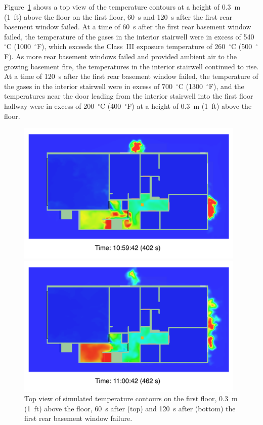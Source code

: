 \documentclass[12pt,oneside]{book}
\begin{document}
Figure~\ref{fig:smv_flow_path_top_2} shows a top view of the temperature contours at a height of 0.3~m (1~ft) above the floor on the first floor, 60~s and 120~s after the first rear basement window failed. At a time of 60~s after the first rear basement window failed, the temperature of the gases in the interior stairwell were in excess of 540~$^{\circ}$C (1000~$^{\circ}$F), which exceeds the Class~III exposure temperature of 260~$^{\circ}$C (500~$^{\circ}$F). As more rear basement windows failed and provided ambient air to the growing basement fire, the temperatures in the interior stairwell continued to rise. At a time of 120~s after the first rear basement window failed, the temperature of the gases in the interior stairwell were in excess of 700~$^{\circ}$C (1300~$^{\circ}$F), and the temperatures near the door leading from the interior stairwell into the first floor hallway were in excess of 200~$^{\circ}$C (400~$^{\circ}$F) at a height of 0.3~m (1~ft) above the floor.


\clearpage


\begin{figure}[!ht]
\includegraphics[width=4.3in]{../Figures/SMV_Top_Temp_402_s}


\includegraphics[width=4.3in]{../Figures/SMV_Top_Temp_462_s}


\caption[Simulated temperature contours on the first floor after basement window failure.]
{Top view of simulated temperature contours on the first floor, 0.3~m (1~ft) above the floor, 60~s after (top) and 120~s after (bottom) the first rear basement window failure.}
\label{fig:smv_flow_path_top_2}
\end{figure}
\end{document}
